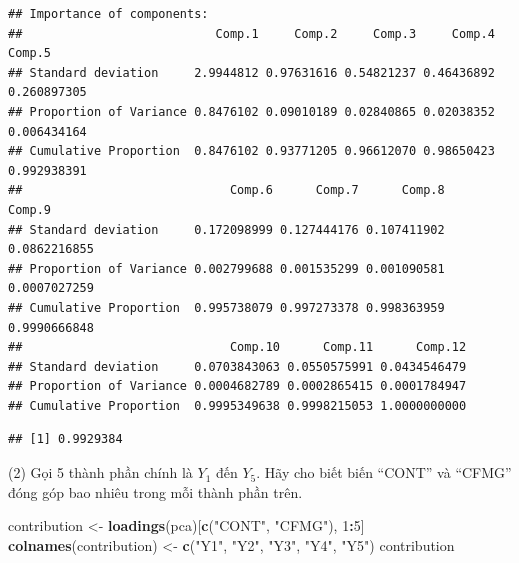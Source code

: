 \documentclass[
]{article}
\newenvironment{Shaded}{\begin{snugshade}}{\end{snugshade}}
\newcommand{\CommentTok}[1]{\textcolor[rgb]{0.56,0.35,0.01}{\textit{#1}}}
\newcommand{\DecValTok}[1]{\textcolor[rgb]{0.00,0.00,0.81}{#1}}
\newcommand{\FunctionTok}[1]{\textcolor[rgb]{0.13,0.29,0.53}{\textbf{#1}}}
\newcommand{\NormalTok}[1]{#1}
\newcommand{\OtherTok}[1]{\textcolor[rgb]{0.56,0.35,0.01}{#1}}
\newcommand{\SpecialCharTok}[1]{\textcolor[rgb]{0.81,0.36,0.00}{\textbf{#1}}}
\newcommand{\StringTok}[1]{\textcolor[rgb]{0.31,0.60,0.02}{#1}}
\begin{document}
\begin{verbatim}
## Importance of components:
##                           Comp.1     Comp.2     Comp.3     Comp.4      Comp.5
## Standard deviation     2.9944812 0.97631616 0.54821237 0.46436892 0.260897305
## Proportion of Variance 0.8476102 0.09010189 0.02840865 0.02038352 0.006434164
## Cumulative Proportion  0.8476102 0.93771205 0.96612070 0.98650423 0.992938391
##                             Comp.6      Comp.7      Comp.8       Comp.9
## Standard deviation     0.172098999 0.127444176 0.107411902 0.0862216855
## Proportion of Variance 0.002799688 0.001535299 0.001090581 0.0007027259
## Cumulative Proportion  0.995738079 0.997273378 0.998363959 0.9990666848
##                             Comp.10      Comp.11      Comp.12
## Standard deviation     0.0703843063 0.0550575991 0.0434546479
## Proportion of Variance 0.0004682789 0.0002865415 0.0001784947
## Cumulative Proportion  0.9995349638 0.9998215053 1.0000000000
\end{verbatim}

\begin{Shaded}
\end{Shaded}

\begin{verbatim}
## [1] 0.9929384
\end{verbatim}

\hfill\break
(2) Gọi 5 thành phần chính là \(Y_1\) đến \(Y_5\). Hãy cho biết biến
``CONT'' và ``CFMG'' đóng góp bao nhiêu trong mỗi thành phần trên.

\begin{Shaded}
\begin{Highlighting}[]
\NormalTok{contribution }\OtherTok{\textless{}{-}} \FunctionTok{loadings}\NormalTok{(pca)[}\FunctionTok{c}\NormalTok{(}\StringTok{"CONT"}\NormalTok{, }\StringTok{"CFMG"}\NormalTok{), }\DecValTok{1}\SpecialCharTok{:}\DecValTok{5}\NormalTok{]}
\FunctionTok{colnames}\NormalTok{(contribution) }\OtherTok{\textless{}{-}} \FunctionTok{c}\NormalTok{(}\StringTok{"Y1"}\NormalTok{, }\StringTok{"Y2"}\NormalTok{, }\StringTok{"Y3"}\NormalTok{, }\StringTok{"Y4"}\NormalTok{, }\StringTok{"Y5"}\NormalTok{)}
\NormalTok{contribution}
\end{Highlighting}
\end{Shaded}
\end{document}
